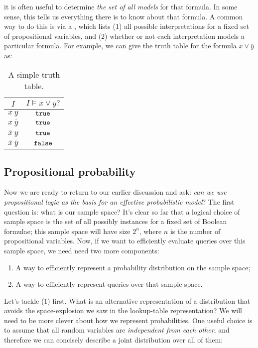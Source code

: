 \documentclass{tufte-handout}
\begin{document}
 it is often useful to determine \emph{the 
set of all models} for that formula. In some sense, this tells us everything 
there is to know about that formula. A common way to do this is via a 
, which lists (1) all possible interpretations for a fixed 
set of propositional variables, and (2) whether or not each interpretation 
models a particular formula. For example, we can give the truth table 
for the formula $x \lor \overline{y}$ as:


\begin{table}
\centering
 \begin{tabular}{c||c}
    \toprule
    $I$ & $ I \models x \lor y?$ \\
    \midrule 
    $x~y$ & $\texttt{true}$ \\ 
    $x ~ \overline{y}$ & $\texttt{true}$ \\ 
    $\overline{x}~y $ & $\texttt{true}$ \\ 
    $\overline{x} ~ \overline{y}$ & $\texttt{false}$ \\ 
    \bottomrule
\end{tabular}
\caption{A simple truth table.}
\end{table}


\subsection{Propositional probability}
Now we are ready to return to our earlier discussion and ask: \emph{can we use
propositional logic as the basis for an effective probabilistic model}?
The first question is: what is our sample space? It's clear so far that a logical 
choice of sample space is the set of all possibly instances for a fixed set 
of Boolean formulae; this sample space will have size $2^n$, where $n$ is the number 
of propositional variables.
Now, if we want to efficiently evaluate queries over this sample space, we need
need two more components:
\begin{enumerate}
    \item A way to efficiently represent a probability distribution on the sample space;
    \item A way to efficiently represent queries over that sample space.
\end{enumerate}

Let's tackle (1) first. What is an alternative representation of a distribution 
that avoids the space-explosion we saw in the lookup-table representation? We 
will need to be more clever about how we represent probabilities. One useful
choice is to assume that all random variables are \emph{independent from each other}, 
and therefore we can concisely describe a joint distribution over all of them:
\end{document}
